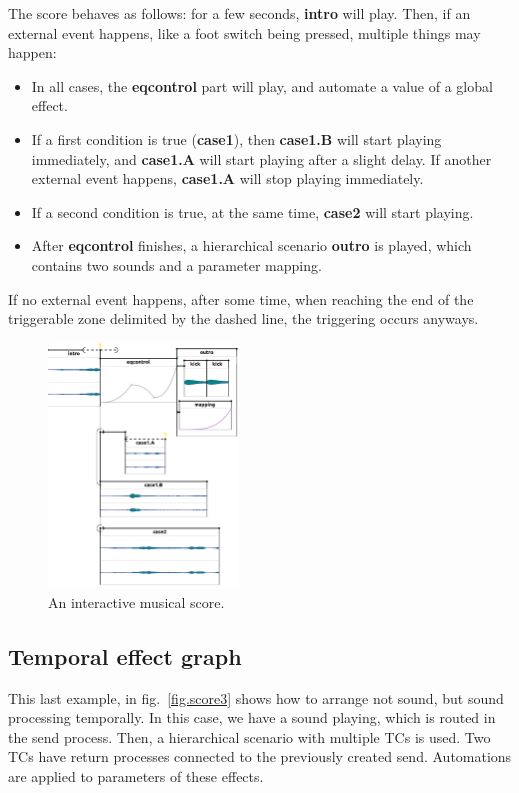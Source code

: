 \documentclass{article}
\newcommand*{\timeconstraints}{\acp{TC}\xspace}
\begin{document}
The score behaves as follows: 
for a few seconds, \textbf{intro} will play.  
Then, if an external event happens, like a foot switch being pressed, 
multiple things may happen: 
\begin{itemize}
    \item In all cases, the \textbf{eqcontrol} part will play, and automate a value of a global effect.
    \item If a first condition is true (\textbf{case1}), then \textbf{case1.B} will start playing immediately, and \textbf{case1.A} will start playing after a slight delay. If another external event happens, \textbf{case1.A} will stop playing immediately.
    \item If a second condition is true, at the same time, \textbf{case2} will start playing.
    \item After \textbf{eqcontrol} finishes, a hierarchical scenario \textbf{outro} is played, which contains two sounds and a parameter mapping.
\end{itemize}
If no external event happens, after some time, when reaching the end of the triggerable zone delimited by the dashed line, the triggering occurs anyways.

\begin{figure}[h]
    \centering
    \includegraphics[width=0.45\textwidth]{figures/ex2.png}
    \caption{An interactive musical score.}
    \label{fig.score2}
\end{figure}

\subsection{Temporal effect graph}
This last example, in fig.~\ref{fig.score3} shows how to arrange not sound, but sound processing temporally.
In this case, we have a sound playing, which is routed in the send process.
Then, a hierarchical scenario with multiple \timeconstraints is used. Two \timeconstraints have return processes connected to the previously created send.
Automations are applied to parameters of these effects.
\end{document}
